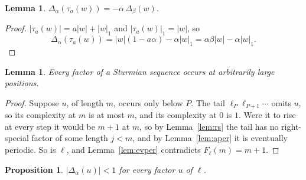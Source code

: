 \documentclass[11pt,a4paper]{article}
\theoremstyle{definition}
\theoremstyle{plain}
\newtheorem{lemma}[definition]{Lemma}
\newtheorem{proposition}[definition]{Proposition}
\begin{document}
\begin{lemma}\label{lem:dev}
$\Delta_\alpha(\tau_a(w)) = -\alpha\,\Delta_\beta(w)$.
\end{lemma}

\begin{proof}
$\lvert \tau_a(w)\rvert = a\lvert w\rvert + \lvert w\rvert_1$ and
$\lvert \tau_a(w)\rvert_1 = \lvert w\rvert$, so
\[
  \Delta_\alpha(\tau_a(w)) = \lvert w\rvert(1 - a\alpha) - \alpha\lvert w\rvert_1
  = \alpha\beta\lvert w\rvert - \alpha\lvert w\rvert_1 .
\]
\end{proof}

\begin{lemma}\label{lem:recur}
Every factor of a Sturmian sequence occurs at arbitrarily large positions.
\end{lemma}

\begin{proof}
Suppose $u$, of length $m$, occurs only below $P$. The tail
$\ell_P\ell_{P+1}\cdots$ omits $u$, so its complexity at $m$ is at most $m$,
and its complexity at $0$ is $1$. Were it to rise at every step it would be
$m+1$ at $m$, so by Lemma~\ref{lem:rs} the tail has no right-special factor of
some length $j < m$, and by Lemma~\ref{lem:aper} it is eventually periodic. So
is $\ell$, and Lemma~\ref{lem:evper} contradicts $F_\ell(m) = m+1$.
\end{proof}

\begin{proposition}\label{prop:bound}
$\lvert \Delta_\alpha(u)\rvert < 1$ for every factor $u$ of $\ell$.
\end{proposition}
\end{document}
